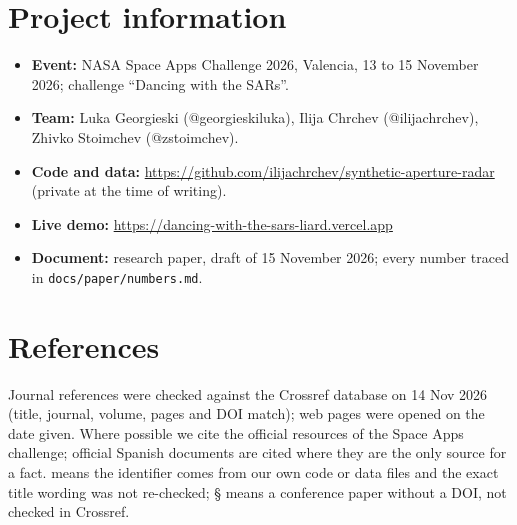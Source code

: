 \documentclass[10pt,twocolumn]{article}
\begin{document}
\section*{Project information}
\begin{itemize}
\item{} \textbf{Event:} NASA Space Apps Challenge 2026, Valencia, 13 to 15 November 2026; challenge ``Dancing with the SARs''.
\item{} \textbf{Team:} Luka Georgieski (@georgieskiluka), Ilija Chrchev (@ilijachrchev), Zhivko Stoimchev (@zstoimchev).
\item{} \textbf{Code and data:} \url{https://github.com/ilijachrchev/synthetic-aperture-radar} (private at the time of writing).
\item{} \textbf{Live demo:} \url{https://dancing-with-the-sars-liard.vercel.app}
\item{} \textbf{Document:} research paper, draft of 15 November 2026; every number traced in \texttt{docs/\allowbreak{}paper/\allowbreak{}numbers.\allowbreak{}md}.
\end{itemize}
\section*{References}\small
Journal references were checked against the Crossref database on 14 Nov 2026 (title, journal, volume, pages and DOI match); web pages were opened on the date given. Where possible we cite the official resources of the Space Apps challenge; official Spanish documents are cited where they are the only source for a fact. \ddag{} means the identifier comes from our own code or data files and the exact title wording was not re-checked; \S{} means a conference paper without a DOI, not checked in Crossref.
\end{document}
